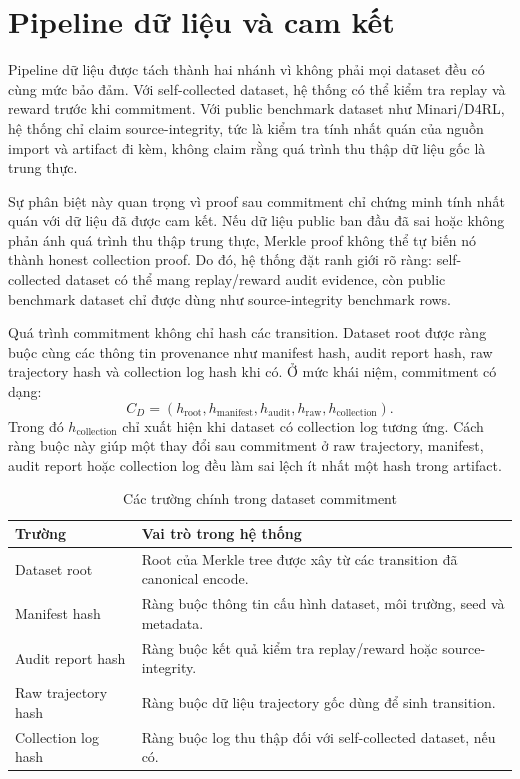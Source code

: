 \documentclass[12pt,a4paper,oneside]{report}
\begin{document}
\section{Pipeline dữ liệu và cam kết}

Pipeline dữ liệu được tách thành hai nhánh vì không phải mọi dataset đều có cùng mức bảo đảm. Với self-collected dataset, hệ thống có thể kiểm tra replay và reward trước khi commitment. Với public benchmark dataset như Minari/D4RL, hệ thống chỉ claim source-integrity, tức là kiểm tra tính nhất quán của nguồn import và artifact đi kèm, không claim rằng quá trình thu thập dữ liệu gốc là trung thực.

Sự phân biệt này quan trọng vì proof sau commitment chỉ chứng minh tính nhất quán với dữ liệu đã được cam kết. Nếu dữ liệu public ban đầu đã sai hoặc không phản ánh quá trình thu thập trung thực, Merkle proof không thể tự biến nó thành honest collection proof. Do đó, hệ thống đặt ranh giới rõ ràng: self-collected dataset có thể mang replay/reward audit evidence, còn public benchmark dataset chỉ được dùng như source-integrity benchmark rows.

Quá trình commitment không chỉ hash các transition. Dataset root được ràng buộc cùng các thông tin provenance như manifest hash, audit report hash, raw trajectory hash và collection log hash khi có. Ở mức khái niệm, commitment có dạng:
\[
C_D =
(h_{\text{root}}, h_{\text{manifest}}, h_{\text{audit}},
h_{\text{raw}}, h_{\text{collection}}).
\]
Trong đó \(h_{\text{collection}}\) chỉ xuất hiện khi dataset có collection log tương ứng. Cách ràng buộc này giúp một thay đổi sau commitment ở raw trajectory, manifest, audit report hoặc collection log đều làm sai lệch ít nhất một hash trong artifact.

\begin{table}[H]
\centering
\caption{Các trường chính trong dataset commitment}
\begin{tabularx}{\textwidth}{p{} p{}}
\toprule
Trường & Vai trò trong hệ thống \\
\midrule
Dataset root & Root của Merkle tree được xây từ các transition đã canonical encode. \\
Manifest hash & Ràng buộc thông tin cấu hình dataset, môi trường, seed và metadata. \\
Audit report hash & Ràng buộc kết quả kiểm tra replay/reward hoặc source-integrity. \\
Raw trajectory hash & Ràng buộc dữ liệu trajectory gốc dùng để sinh transition. \\
Collection log hash & Ràng buộc log thu thập đối với self-collected dataset, nếu có. \\
\bottomrule
\end{tabularx}
\end{table}
\end{document}
